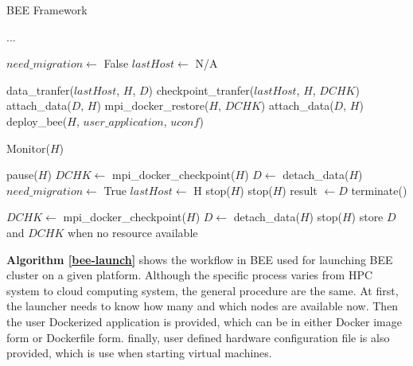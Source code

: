 \begin{algorithm}
\caption{BEE Framework}
\label{bee}
\begin{algorithmic}[1]

{...}


\STATE $need\_migration \leftarrow$ False
\STATE $lastHost \leftarrow$ N/A

		\STATE data\_tranfer($lastHost$, $H$, $D$)
        \STATE checkpoint\_tranfer($lastHost$, $H$, $DCHK$)
		\STATE attach\_data($D$, $H$) 
		\STATE mpi\_docker\_restore($H$, $DCHK$)
	\ELSE
		\STATE attach\_data($D$, $H$)
	\ENDIF
	\STATE deploy\_bee($H$, $user\_application$, $uconf$)

		\STATE Monitor($H$)
	\ENDWHILE

    	\STATE pause($H$)
		\STATE $DCHK \leftarrow$ mpi\_docker\_checkpoint($H$)
		\STATE $D \leftarrow$ detach\_data($H$) 
		\STATE $need\_migration \leftarrow$ True
		\STATE $lastHost \leftarrow$ H
		\STATE stop($H$)
	\ELSE
		\STATE stop($H$)
		\STATE result $\leftarrow D $
		\STATE terminate() 
	\ENDIF
\ENDWHILE

		\STATE $DCHK \leftarrow$ mpi\_docker\_checkpoint($H$)
		\STATE $D\leftarrow$ detach\_data($H$)
		\STATE stop($H$)
		\STATE store $D$ and $DCHK$ when no resource available
\ENDIF

\end{algorithmic}
\end{algorithm}


\textbf{Algorithm \ref{bee-launch}} shows the workflow in BEE used for launching BEE cluster on a given platform. Although the specific process varies from HPC system to cloud computing system, the general procedure are the same. At first, the launcher needs to know how many and which nodes are available now. Then the user Dockerized application is provided, which can be in either Docker image form or Dockerfile form. finally, user defined hardware configuration file is also provided, which is use when starting virtual machines. 

